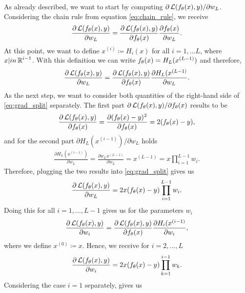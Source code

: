 \begin{example}
\begin{enumerate}
As already described, we want to start by computing $\partial \operatorname{\mathcal{L}} (f_{\theta}(x), y) / \partial w_L$. Considering the chain rule from equation \eqref{eq:chain_rule}, we receive
\begin{align*}
\frac{\partial \operatorname{\mathcal{L}} (f_{\theta}(x), y)}{ \partial w_L} = \frac{\partial \operatorname{\mathcal{L}} (f_{\theta}(x), y)}{\partial f_{\theta}(x)} \frac{\partial f_{\theta}(x)}{ \partial w_L}.
\end{align*}
At this point, we want to define $x^{(i)}\coloneqq H_i(x)$ for all $i=1,\ldots L$, where $x|in\operatorname{\mathbb{R}}^{i-1}$. With this definition we can write $f_{\theta}(x) = H_L(x^{(L-1)})$ and therefore,
\begin{align}\label{eq:grad_split}
\frac{\partial \operatorname{\mathcal{L}} (f_{\theta}(x), y)}{ \partial w_L} = \frac{\partial \operatorname{\mathcal{L}} (f_{\theta}(x), y)}{\partial f_{\theta}(x)} \frac{\partial H_L(x^{(L-1)}}{ \partial w_L}.
\end{align}
As the next step, we want to consider both quantities of the right-hand side of \eqref{eq:grad_split} separately. The first part $\partial \operatorname{\mathcal{L}} (f_{\theta}(x), y) / \partial f_{\theta}(x)$ results to be
\begin{align*}
\frac{\partial \operatorname{\mathcal{L}} (f_{\theta}(x), y)}{\partial f_{\theta}(x)} = \frac{\partial (f_{\theta}(x) - y)^2}{\partial f_{\theta}(x)} = 2 (f_{\theta}(x) - y),
\end{align*}
and for the second part $\partial H_L(x^{(i-1)}) /\partial w_L$ holds
\begin{align*}
\frac{\partial H_L(x^{(i-1)})}{ \partial w_L} = \frac{\partial w_Lx^{(L-1)}}{ \partial w_L} = x^{(L-1)} = x\prod_{i=1}^{L-1} w_i.
\end{align*}
Therefore, plugging the two results into \eqref{eq:grad_split} gives us
\begin{align*}
\frac{\partial \operatorname{\mathcal{L}} (f_{\theta}(x), y)}{ \partial w_L} = 2x (f_{\theta}(x) - y) \prod_{i=1}^{L-1} w_i.
\end{align*}
Doing this for all $i=1,\ldots, L-1$ gives us for the parameters $w_i$
\begin{align*}
\frac{\partial \operatorname{\mathcal{L}} (f_{\theta}(x), y)}{ \partial w_i} = \frac{\partial \operatorname{\mathcal{L}} (f_{\theta}(x), y)}{\partial f_{\theta}(x)} \frac{\partial H_i(x^{(i-1)}}{ \partial w_i},
\end{align*}
where we define $x^{(0)} \coloneqq x$. Hence, we receive for $i=2,\ldots,L$
\begin{align*}
\frac{\partial \operatorname{\mathcal{L}} (f_{\theta}(x), y)}{ \partial w_i} = 2x (f_{\theta}(x) - y) \prod_{k=1}^{i-1} w_k.
\end{align*}
Considering the case $i=1$ separately, gives us
\begin{align*}

\end{align*}
\end{enumerate}
\end{example}
